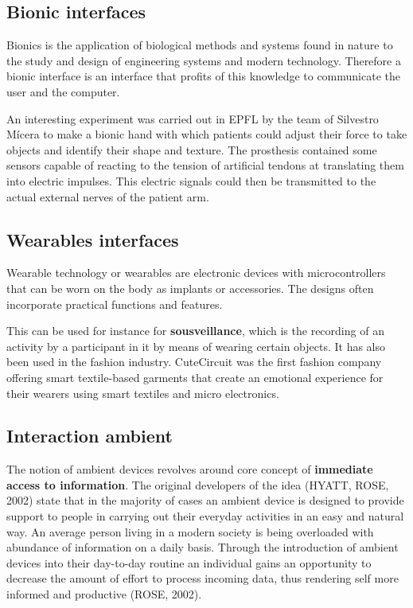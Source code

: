 \subsection{Bionic interfaces}

Bionics is the application of biological methods and systems found in nature to the study and design of engineering systems and modern technology. Therefore a bionic interface is an interface that profits of this knowledge to communicate the user and the computer.

An interesting experiment was carried out in EPFL by the team of Silvestro M\'icera to make a bionic hand with which patients could adjust their force to take objects and identify their shape and texture. The prosthesis contained some sensors capable of reacting to the tension of artificial tendons at translating them into electric impulses. This electric signals could then be transmitted to the actual external nerves of the patient arm.

\subsection{Wearables interfaces}

Wearable technology or wearables are electronic devices with microcontrollers that can be worn on the body as implants or accessories. The designs often incorporate practical functions and features.

This can be used for instance for \textbf{sousveillance}, which is the recording of an activity by a participant in it by means of wearing certain objects. It has also been used in the fashion industry. CuteCircuit was the first fashion company offering smart textile-based garments that create an emotional experience for their wearers using smart textiles and micro electronics.

\subsection{Interaction ambient}

The notion of ambient devices revolves around core concept of \textbf{immediate access to information}. The original developers of the idea (HYATT, ROSE, 2002) state that in the majority of cases an ambient device is designed to provide support to people in carrying out their everyday activities in an easy and natural way. An average person living in a modern society is being overloaded with abundance of information on a daily basis. Through the introduction of ambient devices into their day-to-day routine an individual gains an opportunity to decrease the amount of effort to process incoming data, thus rendering self more informed and productive (ROSE, 2002).

